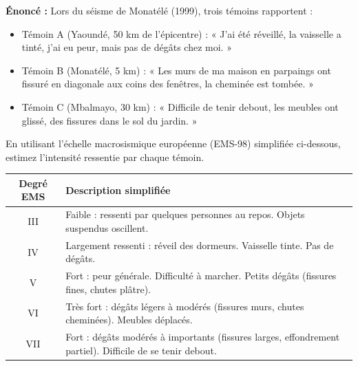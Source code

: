 \documentclass[11pt]{article}
\begin{document}
\begin{exoresolu}
\textbf{Énoncé :} Lors du séisme de Monatélé (1999), trois témoins rapportent :
\begin{itemize}
    \item Témoin A (Yaoundé, 50 km de l'épicentre) : « J'ai été réveillé, la vaisselle a tinté, j'ai eu peur, mais pas de dégâts chez moi. »
    \item Témoin B (Monatélé, 5 km) : « Les murs de ma maison en parpaings ont fissuré en diagonale aux coins des fenêtres, la cheminée est tombée. »
    \item Témoin C (Mbalmayo, 30 km) : « Difficile de tenir debout, les meubles ont glissé, des fissures dans le sol du jardin. »
\end{itemize}
En utilisant l'échelle macrosismique européenne (EMS-98) simplifiée ci-dessous, estimez l'intensité ressentie par chaque témoin.
\begin{center}
\begin{tabular}{|c|l|}\hline
\textbf{Degré EMS} & \textbf{Description simplifiée} \\ \hline
III & Faible : ressenti par quelques personnes au repos. Objets suspendus oscillent. \\ \hline
IV & Largement ressenti : réveil des dormeurs. Vaisselle tinte. Pas de dégâts. \\ \hline
V & Fort : peur générale. Difficulté à marcher. Petits dégâts (fissures fines, chutes plâtre). \\ \hline
VI & Très fort : dégâts légers à modérés (fissures murs, chutes cheminées). Meubles déplacés. \\ \hline
VII & Fort : dégâts modérés à importants (fissures larges, effondrement partiel). Difficile de se tenir debout. \\ \hline
\end{tabular}
\end{center}


\end{exoresolu}
\end{document}
